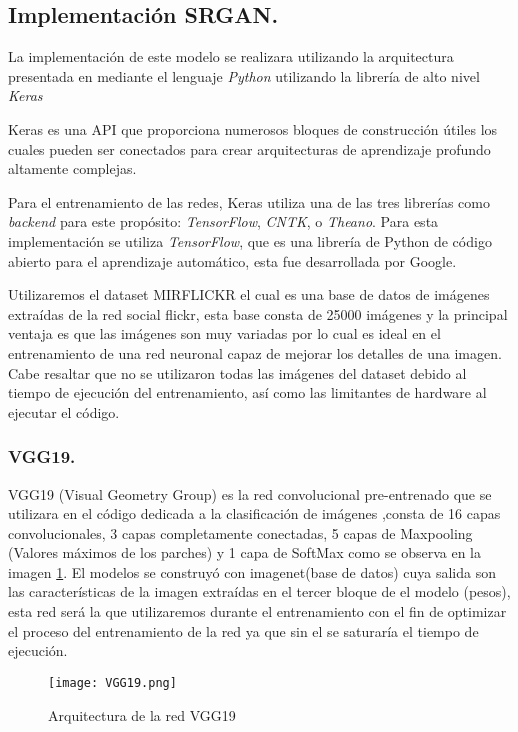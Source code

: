 \subsection{Implementación SRGAN.}

La implementación de este modelo se realizara utilizando la arquitectura presentada
en \cite{SRGAN} mediante el lenguaje \emph{Python} utilizando la librería de alto nivel \emph{Keras}

Keras es una API que proporciona numerosos bloques
de construcción útiles los cuales pueden ser conectados para crear arquitecturas de
aprendizaje profundo altamente complejas.

Para el entrenamiento de las redes, Keras utiliza una de las tres librerías como
\emph{backend} para este propósito: \emph{TensorFlow}, \emph{CNTK}, o \emph{Theano}. Para esta implementación
se utiliza \emph{TensorFlow}, que es una librería de Python de código abierto para el
aprendizaje automático, esta fue desarrollada por Google.

Utilizaremos el dataset MIRFLICKR \cite{MIRFLICKR} el cual es una base de datos de imágenes
extraídas de la red social flickr, esta base consta de 25000 imágenes y la principal ventaja es 
que las imágenes son muy variadas por lo cual es ideal en el entrenamiento de una red neuronal capaz 
de mejorar los detalles de una imagen. Cabe resaltar que no se utilizaron todas las imágenes del dataset
debido al tiempo de ejecución del entrenamiento, así como las limitantes de hardware al ejecutar el código.

\subsubsection{VGG19.}

VGG19 (Visual Geometry Group) es la red convolucional pre-entrenado que se utilizara en el código
dedicada a la clasificación de imágenes ,consta de 16 capas convolucionales, 3 capas completamente conectadas, 5 capas de 
Maxpooling (Valores máximos de los parches)  y 1 capa de SoftMax como se observa en la imagen \ref{Alexis35}. El modelos se construyó
 con imagenet(base de datos) cuya salida son las características de la imagen extraídas en el tercer bloque de el modelo (pesos),
 esta red será la que utilizaremos durante el entrenamiento con el fin de optimizar el proceso del entrenamiento de la red
ya que sin el se saturaría el tiempo de ejecución.

 
\begin{figure}[H]
  \begin{center}
    \texttt{[image: VGG19.png]}
    \caption{Arquitectura de la red VGG19}
    \label{Alexis35}
  \end{center}
\end{figure}


